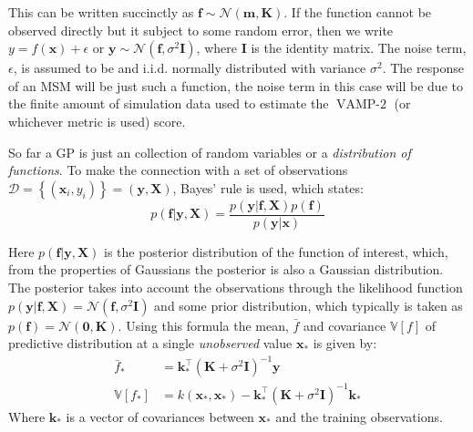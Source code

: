 This can be written succinctly as $\mathbf{f} \sim \mathcal{N}(\mathbf{m}, \mathbf{K})$. If the function cannot be observed directly but it subject to some random error, then we write $y = f(\mathbf{x}) + \epsilon$ or  $\mathbf{y} \sim \mathcal{N}(\mathbf{f}, \sigma^{2}\mathbf{I})$, where $\mathbf{I}$ is the identity matrix.  The noise term, $\epsilon$, is assumed to be and i.i.d. normally distributed with variance $\sigma^{2}$. The response of an MSM will be just such a function, the noise term in this case will be due to the finite amount of simulation data used to estimate the $\operatorname{VAMP-2}$ (or whichever metric is used) score. 

So far a GP is just an collection of random variables or a \emph{distribution of functions}.  To make the connection with a set of observations $\mathcal{D}=\left\{(\mathbf{x}_{i}, y_{i})\right\} = (\mathbf{y}, \mathbf{X})$, Bayes' rule is used, which states: 
\begin{equation}\label{eqn:ya_boy_bayes}
    p(\mathbf{f}|\mathbf{y}, \mathbf{X})  = \frac{p(\mathbf{y}|\mathbf{f}, \mathbf{X})p(\mathbf{f})}{p(\mathbf{y}|\mathbf{x})}
\end{equation}

Here $p(\mathbf{f}|\mathbf{y}, \mathbf{X})$ is the posterior distribution of the function of interest, which, from the properties of Gaussians the posterior is also a Gaussian distribution. The posterior takes into account the observations through the likelihood function $p(\mathbf{y}|\mathbf{f}, \mathbf{X}) = \mathcal{N}(\mathbf{f}, \sigma^{2}\mathbf{I})$ and some prior distribution, which typically is taken as $p(\mathbf{f}) = \mathcal{N}(\mathbf{0}, \mathbf{K})$.  Using this formula the mean, $\bar{f}$ and covariance $\mathbb{V}\left[f\right]$ of predictive distribution at a single  \emph{unobserved} value $\mathbf{x}_{*}$ is given by: 
\begin{equation}\label{eqn:gp_pred_dist}
\begin{aligned}
\bar{f}_{*} &=\mathbf{k}_{*}^{\top}\left(\mathbf{K}+\sigma^{2} \mathbf{I}\right)^{-1} \mathbf{y} \\
\mathbb{V}\left[f_{*}\right] &=k\left(\mathbf{x}_{*}, \mathbf{x}_{*}\right)-\mathbf{k}_{*}^{\top}\left(\mathbf{K}+\sigma^{2} \mathbf{I}\right)^{-1} \mathbf{k}_{*}
\end{aligned}
\end{equation}
Where $\mathbf{k}_{*}$ is a vector of covariances between $\mathbf{x}_{*}$ and the training observations. 

